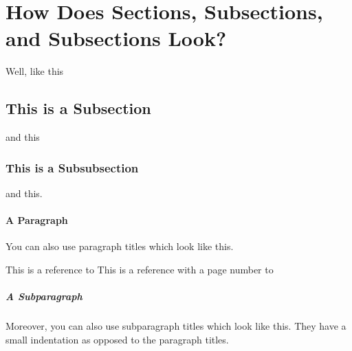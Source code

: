 \section{How Does Sections, Subsections, and Subsections Look?}
Well, like this
\subsection{This is a Subsection}
and this
\subsubsection{This is a Subsubsection}
and this.

\paragraph{A Paragraph}
You can also use paragraph titles which look like this.

This is a reference to 
\newline
This is a reference with a page number to 

\subparagraph{A Subparagraph} Moreover, you can also use subparagraph titles which look like this. They have a small indentation as opposed to the paragraph titles.

